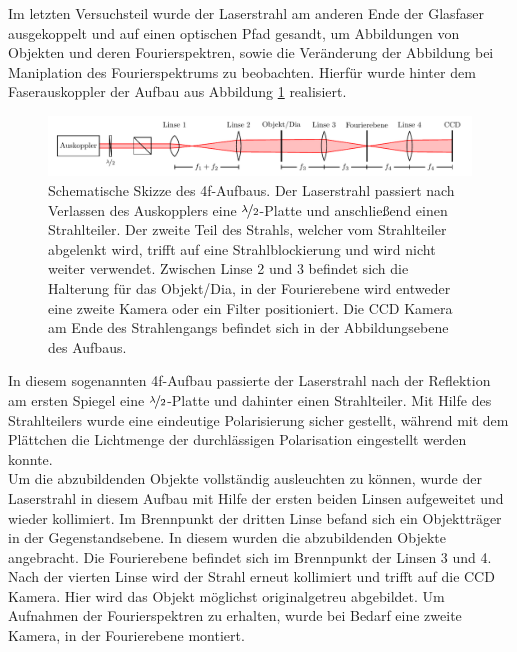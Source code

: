 
Im letzten Versuchsteil wurde der Laserstrahl am anderen Ende der Glasfaser ausgekoppelt und auf einen optischen Pfad gesandt, um Abbildungen von Objekten und deren Fourierspektren, sowie die Veränderung der Abbildung bei Maniplation des Fourierspektrums zu beobachten. Hierfür wurde hinter dem Faserauskoppler der Aufbau aus Abbildung \ref{fig:4f-aufbau} realisiert.

\begin{figure}[h]
	\centering
	\includegraphics[width=1\linewidth]{graphs/versuchsaufbau/4f-aufbau.pdf}
	\caption[Schematische Skizze des 4f-Aufbaus]{
		Schematische Skizze des 4f-Aufbaus. Der Laserstrahl passiert nach Verlassen des Auskopplers eine $\nicefrac{\lambda}{2}$-Platte und anschließend einen Strahlteiler. Der zweite Teil des Strahls, welcher vom Strahlteiler abgelenkt wird, trifft auf eine Strahlblockierung und wird nicht weiter verwendet. Zwischen Linse 2 und 3 befindet sich die Halterung für das Objekt/Dia, in der Fourierebene wird entweder eine zweite Kamera oder ein Filter positioniert. Die CCD Kamera am Ende des Strahlengangs befindet sich in der Abbildungsebene des Aufbaus.
	}
	\label{fig:4f-aufbau}
\end{figure}

In diesem sogenannten 4f-Aufbau passierte der Laserstrahl nach der Reflektion am ersten Spiegel eine $\nicefrac{\lambda}{2}$-Platte und dahinter einen Strahlteiler. Mit Hilfe des Strahlteilers wurde eine eindeutige Polarisierung sicher gestellt, während mit dem Plättchen die Lichtmenge der durchlässigen Polarisation eingestellt werden konnte.\\

Um die abzubildenden Objekte vollständig ausleuchten zu können, wurde der Laserstrahl in diesem Aufbau mit Hilfe der ersten beiden Linsen aufgeweitet und wieder kollimiert. Im Brennpunkt der dritten Linse befand sich ein Objektträger in der Gegenstandsebene. In diesem wurden die abzubildenden Objekte angebracht. Die Fourierebene befindet sich im Brennpunkt der Linsen 3 und 4. Nach der vierten Linse wird der Strahl erneut kollimiert und trifft auf die CCD Kamera. Hier wird das Objekt möglichst originalgetreu abgebildet. Um Aufnahmen der Fourierspektren zu erhalten, wurde bei Bedarf eine zweite Kamera, in der Fourierebene montiert. \\ 


